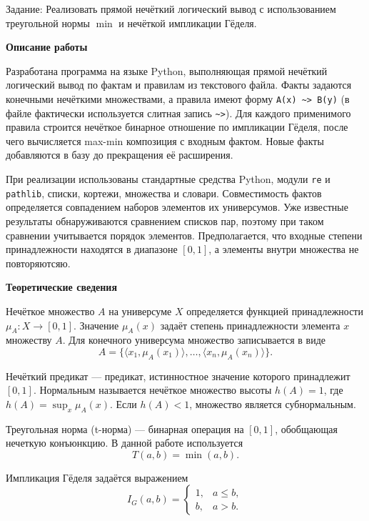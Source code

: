 \documentclass[14pt,a4paper]{extarticle}
\newcommand{\reportheading}[1]{\par\vspace{0.8\baselineskip}\noindent\textbf{#1}\par\nobreak\vspace{0.35\baselineskip}\nobreak}
\begin{document}
\noindent Задание: Реализовать прямой нечёткий логический вывод с использованием треугольной нормы $\min$ и нечёткой импликации Гёделя.

\reportheading{Описание работы}
Разработана программа на языке Python, выполняющая прямой нечёткий логический вывод по фактам и правилам из текстового файла. Факты задаются конечными нечёткими множествами, а правила имеют форму \texttt{A(x) \textasciitilde > B(y)} (в файле фактически используется слитная запись \texttt{\textasciitilde>}). Для каждого применимого правила строится нечёткое бинарное отношение по импликации Гёделя, после чего вычисляется max-min композиция с входным фактом. Новые факты добавляются в базу до прекращения её расширения.

При реализации использованы стандартные средства Python, модули \texttt{re} и \texttt{pathlib}, списки, кортежи, множества и словари. Совместимость фактов определяется совпадением наборов элементов их универсумов. Уже известные результаты обнаруживаются сравнением списков пар, поэтому при таком сравнении учитывается порядок элементов. Предполагается, что входные степени принадлежности находятся в диапазоне $[0,1]$, а элементы внутри множества не повторяютсяю.

\reportheading{Теоретические сведения}
Нечёткое множество $A$ на универсуме $X$ определяется функцией принадлежности $\mu_A:X\to[0,1]$. Значение $\mu_A(x)$ задаёт степень принадлежности элемента $x$ множеству $A$. Для конечного универсума множество записывается в виде
\begin{equation}
 A=\{\langle x_1,\mu_A(x_1)\rangle,\ldots,\langle x_n,\mu_A(x_n)\rangle\}.
\end{equation}

Нечёткий предикат --- предикат, истинностное значение которого принадлежит $[0,1]$. Нормальным называется нечёткое множество высоты $h(A)=1$, где $h(A)=\sup_x\mu_A(x)$. Если $h(A)<1$, множество является субнормальным.

Треугольная норма (t-норма) --- бинарная операция на $[0,1]$, обобщающая нечеткую конъюнкцию. В данной работе используется
\begin{equation}
 T(a,b)=\min(a,b).
\end{equation}

Импликация Гёделя задаётся выражением
\begin{equation}
 I_G(a,b)=
 \begin{cases}
  1, & a\leq b,\\
  b, & a>b.
 \end{cases}
 \label{eq:godel}
\end{equation}
\end{document}
